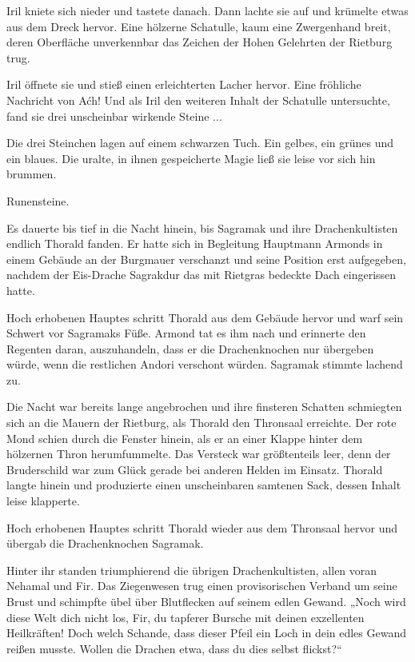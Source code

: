 Iril kniete sich nieder und tastete danach. Dann lachte sie auf und krümelte etwas aus dem Dreck hervor. Eine hölzerne Schatulle, kaum eine Zwergenhand breit, deren Oberfläche unverkennbar das Zeichen der Hohen Gelehrten der Rietburg trug.

Iril öffnete sie und stieß einen erleichterten Lacher hervor. Eine fröhliche Nachricht von Aćh! Und als Iril den weiteren Inhalt der Schatulle untersuchte, fand sie drei unscheinbar wirkende Steine ...

Die drei Steinchen lagen auf einem schwarzen Tuch. Ein gelbes, ein grünes und ein blaues. Die uralte, in ihnen gespeicherte Magie ließ sie leise vor sich hin brummen.

Runensteine.



\trennzeichen



Es dauerte bis tief in die Nacht hinein, bis Sagramak und ihre Drachenkultisten endlich Thorald fanden. Er hatte sich in Begleitung Hauptmann Armonds in einem Gebäude an der Burgmauer verschanzt und seine Position erst aufgegeben, nachdem der Eis-Drache Sagrakdur das mit Rietgras bedeckte Dach eingerissen hatte.

Hoch erhobenen Hauptes schritt Thorald aus dem Gebäude hervor und warf sein Schwert vor Sagramaks Füße. Armond tat es ihm nach und erinnerte den Regenten daran, auszuhandeln, dass er die Drachenknochen nur übergeben würde, wenn die restlichen Andori verschont würden. Sagramak stimmte lachend zu.

Die Nacht war bereits lange angebrochen und ihre finsteren Schatten schmiegten sich an die Mauern der Rietburg, als Thorald den Thronsaal erreichte. Der rote Mond schien durch die Fenster hinein, als er an einer Klappe hinter dem hölzernen Thron herumfummelte. Das Versteck war größtenteils leer, denn der Bruderschild war zum Glück gerade bei anderen Helden im Einsatz. Thorald langte hinein und produzierte einen unscheinbaren samtenen Sack, dessen Inhalt leise klapperte.

Hoch erhobenen Hauptes schritt Thorald wieder aus dem Thronsaal hervor und übergab die Drachenknochen Sagramak.

Hinter ihr standen triumphierend die übrigen Drachenkultisten, allen voran Nehamal und Fir. Das Ziegenwesen trug einen provisorischen Verband um seine Brust und schimpfte übel über Blutflecken auf seinem edlen Gewand. „Noch wird diese Welt dich nicht los, Fir, du tapferer Bursche mit deinen exzellenten Heilkräften! Doch welch Schande, dass dieser Pfeil ein Loch in dein edles Gewand reißen musste. Wollen die Drachen etwa, dass du dies selbst flickst?“

